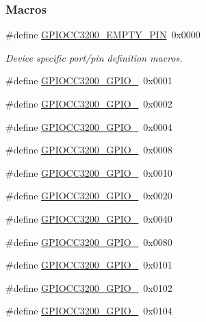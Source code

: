 \subsubsection*{Macros}
\begin{DoxyCompactItemize}
\item 
\#define \hyperlink{_g_p_i_o_c_c3200_8h_a5e7e582daec7fc79e7ef88bd015c7a6c}{G\+P\+I\+O\+C\+C3200\+\_\+\+E\+M\+P\+T\+Y\+\_\+\+P\+I\+N}~0x0000
\begin{DoxyCompactList}\small\item\em Device specific port/pin definition macros. \end{DoxyCompactList}\item 
\#define \hyperlink{_g_p_i_o_c_c3200_8h_a6cb5b0e9b310d34a9cc6151d87c712f7}{G\+P\+I\+O\+C\+C3200\+\_\+\+G\+P\+I\+O\+\_}~0x0001
\item 
\#define \hyperlink{_g_p_i_o_c_c3200_8h_a8210c14a4986fe3206f9b3723153602e}{G\+P\+I\+O\+C\+C3200\+\_\+\+G\+P\+I\+O\+\_}~0x0002
\item 
\#define \hyperlink{_g_p_i_o_c_c3200_8h_adc0e5d58e132621ceab31d7862b948c9}{G\+P\+I\+O\+C\+C3200\+\_\+\+G\+P\+I\+O\+\_}~0x0004
\item 
\#define \hyperlink{_g_p_i_o_c_c3200_8h_a711fc69488b035d57ac084da865392a8}{G\+P\+I\+O\+C\+C3200\+\_\+\+G\+P\+I\+O\+\_}~0x0008
\item 
\#define \hyperlink{_g_p_i_o_c_c3200_8h_a5a68bc0944d0ca2316733440f697850c}{G\+P\+I\+O\+C\+C3200\+\_\+\+G\+P\+I\+O\+\_}~0x0010
\item 
\#define \hyperlink{_g_p_i_o_c_c3200_8h_ab927a53598dc39ced3f6223960077545}{G\+P\+I\+O\+C\+C3200\+\_\+\+G\+P\+I\+O\+\_}~0x0020
\item 
\#define \hyperlink{_g_p_i_o_c_c3200_8h_a30ffb9c8fa86a2c506735e062c771b12}{G\+P\+I\+O\+C\+C3200\+\_\+\+G\+P\+I\+O\+\_}~0x0040
\item 
\#define \hyperlink{_g_p_i_o_c_c3200_8h_ad45daa5f44f1770f3ac4c48ad843e949}{G\+P\+I\+O\+C\+C3200\+\_\+\+G\+P\+I\+O\+\_}~0x0080
\item 
\#define \hyperlink{_g_p_i_o_c_c3200_8h_a710a27ac2d241f6e4ae9e9705f1f2a8a}{G\+P\+I\+O\+C\+C3200\+\_\+\+G\+P\+I\+O\+\_}~0x0101
\item 
\#define \hyperlink{_g_p_i_o_c_c3200_8h_ac1c1f7165ee9db6935e55c8545315b1d}{G\+P\+I\+O\+C\+C3200\+\_\+\+G\+P\+I\+O\+\_}~0x0102
\item 
\#define \hyperlink{_g_p_i_o_c_c3200_8h_afebeb9277c7bca291cf550af3e218aa0}{G\+P\+I\+O\+C\+C3200\+\_\+\+G\+P\+I\+O\+\_}~0x0104

\end{DoxyCompactItemize}
